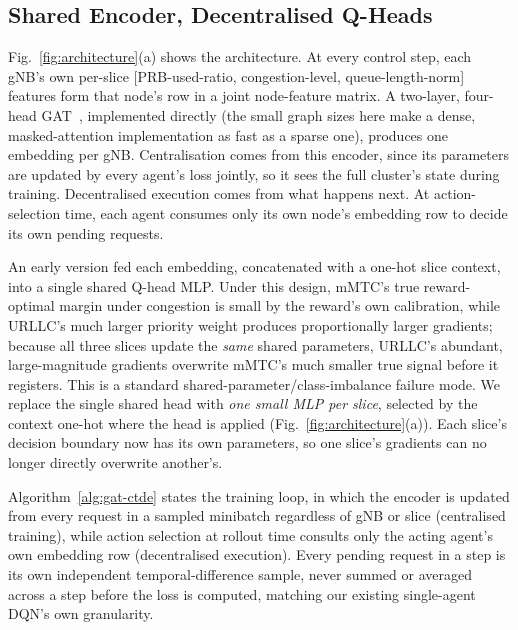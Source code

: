 \documentclass[pdflatex,sn-basic,Numbered]{sn-jnl}%
\begin{document}
\subsection{Shared Encoder, Decentralised Q-Heads}
Fig.~\ref{fig:architecture}(a) shows the architecture. At every control
step, each gNB's own per-slice [PRB-used-ratio, congestion-level,
queue-length-norm] features form that node's row in a joint
node-feature matrix. A two-layer, four-head GAT~\cite{gat}, implemented
directly (the small graph sizes here make a dense, masked-attention
implementation as fast as a sparse one), produces one embedding per
gNB. Centralisation comes from this encoder, since its parameters are updated by every agent's loss jointly, so it sees the full cluster's state during training. Decentralised execution comes from what happens next. At action-selection time, each agent consumes only its own node's embedding row to decide its own pending requests.

\label{sec:methodology-perslice}
An early version fed each embedding, concatenated with a one-hot slice
context, into a single shared Q-head MLP. Under this design, mMTC's
true reward-optimal margin under congestion is small by the reward's
own calibration, while URLLC's much larger priority weight produces
proportionally larger gradients; because all three slices update the \emph{same} shared parameters, URLLC's abundant, large-magnitude gradients overwrite mMTC's much smaller true signal before it registers. This is a standard shared-parameter/class-imbalance failure mode.
We replace the single shared head with \emph{one small MLP per slice}, selected by the context one-hot where the head is applied (Fig.~\ref{fig:architecture}(a)). Each slice's decision boundary now has its own parameters, so one slice's gradients can no longer directly overwrite another's.

Algorithm~\ref{alg:gat-ctde} states the training loop, in which the encoder is updated from every request in a sampled minibatch regardless of gNB or slice (centralised training), while action selection at rollout time consults only the acting agent's own embedding row (decentralised execution). Every pending request in a step is its own independent
temporal-difference sample, never summed or averaged across a step
before the loss is computed, matching our existing single-agent DQN's
own granularity.
\end{document}
